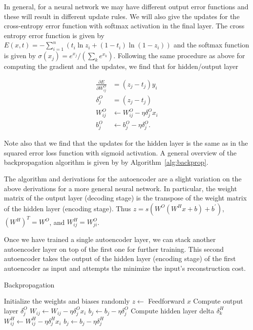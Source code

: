In general, for a neural network we may have different output error functions and these will result in different update rules. We will also give the updates
for the cross-entropy error function with softmax activation in the final layer.
The cross entropy error function is given by $E(x,t) = -\sum_{i=1}^n \left(t_i\ln z_i + (1-t_i)\ln(1-z_i)\right)$
and the softmax function is given by $\sigma(x_j) = e^{x_j} /(\sum_k e^{x_k})$. Following the same procedure as above
for computing the gradient and the updates, we find that for hidden/output layer

\begin{equation}
\begin{split}
\frac{\partial E}{\partial W^O_{ij}} &= (z_j - t_j)y_i \\
\delta^O_j &= (z_j-t_j) \\
W^O_{ij} &\leftarrow W^O_{ij} - \eta \delta^O_j x_i \\
b^O_j &\leftarrow b^O_j - \eta\delta^O_j.
\end{split}
\end{equation}

Note also that we find that the updates for the hidden layer is the same as in the squared error loss function with sigmoid activation. A general overview of the backpropagation algorithm is given by by Algorithm~\ref{alg:backprop}.

The algorithm and derivations for the autoencoder are a slight variation on the above derivations for a more general neural network. In particular, the weight matrix of the output layer (decoding stage) is the transpose of the weight matrix of the hidden layer (encoding stage). Thus $z=s(W^{O}(W^{H}x + b) + b^{'})$, $(W^H)^T = W^O$, and $W^H_{ij} = W^O_{ji}$. 

Once we have trained a single autoencoder layer, we can stack another autoencoder layer on top of the first one for further training. This second autoencoder takes the output of the hidden layer (encoding stage) of the first autoencoder as input and attempts the minimize the input's reconstruction cost.

\begin{algorithm}[h]
\caption{Backpropagation}
\label{alg:backprop}
\begin{algorithmic}
\STATE Initialize the weights and biases randomly
		\STATE $z\gets$ Feedforward $x$
		\STATE Compute output layer $\delta_j^O$
		\STATE ${W_{ij} \leftarrow W_{ij} - \eta \delta^O_j x_i}$
		\STATE $b_j \leftarrow b_j - \eta\delta^O_j$
			\STATE Compute hidden layer delta $\delta_k^H$
			\STATE ${W^H_{ij} \leftarrow W^H_{ij} - \eta\delta^H_jx_i}$
			\STATE $b_j \leftarrow b_j - \eta\delta^H_j$
		\ENDFOR
	\ENDFOR
\ENDFOR
\end{algorithmic}
\end{algorithm}

